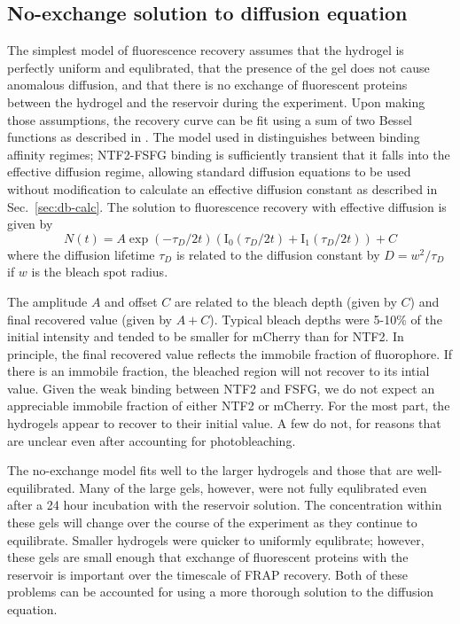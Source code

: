 \subsection{No-exchange solution to diffusion equation}
\label{sec:no-exchange}

The simplest model of fluorescence recovery assumes that the hydrogel is perfectly uniform and equlibrated, that the presence of the gel does not cause anomalous diffusion, and that there is no exchange of fluorescent proteins between the hydrogel and the reservoir during the experiment.  Upon making those assumptions, the recovery curve can be fit using a sum of two Bessel functions as described in \cite{yang18,sprague04}.  The model used in \cite{sprague04} distinguishes between binding affinity regimes; NTF2-FSFG binding is sufficiently transient that it falls into the effective diffusion regime, allowing standard diffusion equations to be used without modification to calculate an effective diffusion constant as described in Sec.~\ref{sec:db-calc}.  The solution to fluorescence recovery with effective diffusion is given by
\begin{equation}
N(t) = A\exp(-\tau_D/2t)\left(\mathrm{I}_0(\tau_D/2t)+\mathrm{I}_1(\tau_D/2t)\right)+C
\end{equation} where the diffusion lifetime $\tau_D$ is related to the diffusion constant by $D = w^2/\tau_D$ if $w$ is the bleach spot radius.  

The amplitude $A$ and offset $C$ are related to the bleach depth (given by $C$) and final recovered value (given by $A+C$).  Typical bleach depths were 5-10\% of the initial intensity and tended to be smaller for mCherry than for NTF2.  In principle, the final recovered value reflects the immobile fraction of fluorophore.  If there is an immobile fraction, the bleached region will not recover to its intial value.  Given the weak binding between NTF2 and FSFG, we do not expect an appreciable immobile fraction of either NTF2 or mCherry.  For the most part, the hydrogels appear to recover to their initial value.  A few do not, for reasons that are unclear even after accounting for photobleaching.

The no-exchange model fits well to the larger hydrogels and those that are well-equilibrated.  Many of the large gels, however, were not fully equlibrated even after a 24 hour incubation with the reservoir solution.  The concentration within these gels will change over the course of the experiment as they continue to equilibrate.  Smaller hydrogels were quicker to uniformly equlibrate; however, these gels are small enough that exchange of fluorescent proteins with the reservoir is important over the timescale of FRAP recovery.  Both of these problems can be accounted for using a more thorough solution to the diffusion equation.

